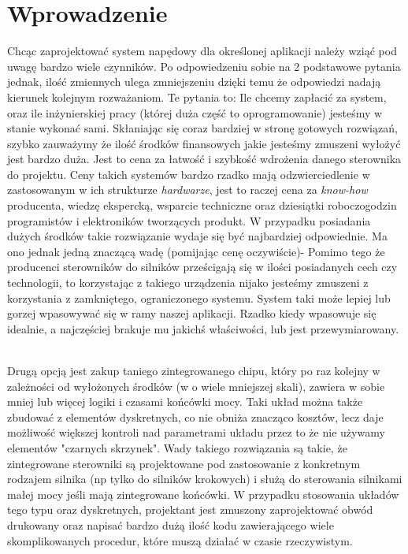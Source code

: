\section*{Wprowadzenie}
Chcąc zaprojektować system napędowy dla określonej aplikacji należy wziąć pod uwagę bardzo wiele czynników. Po odpowiedzeniu sobie na 2 podstawowe pytania jednak, ilość zmiennych ulega zmniejszeniu dzięki temu że odpowiedzi nadają kierunek kolejnym rozważaniom. Te pytania to: Ile chcemy zapłacić za system, oraz ile inżynierskiej pracy (której duża część to oprogramowanie) jesteśmy w stanie wykonać sami. Skłaniając się coraz bardziej w stronę gotowych rozwiązań, szybko zauważymy że ilość środków finansowych jakie jesteśmy zmuszeni wyłożyć jest bardzo duża. Jest to cena za łatwość i szybkość wdrożenia danego sterownika do projektu. Ceny takich systemów bardzo rzadko mają odzwierciedlenie w zastosowanym w ich strukturze {\it hardwarze}, jest to raczej cena za {\it know-how} producenta, wiedzę ekspercką, wsparcie techniczne oraz dziesiątki roboczogodzin programistów i elektroników tworzących produkt. W przypadku posiadania dużych środków takie rozwiązanie wydaje się być najbardziej odpowiednie. Ma ono jednak jedną znaczącą wadę (pomijając cenę oczywiście)- Pomimo tego że producenci sterowników do silników prześcigają się w ilości posiadanych cech czy technologii, to korzystając z takiego urządzenia nijako jesteśmy zmuszeni z korzystania z zamkniętego, ograniczonego systemu. System taki może lepiej lub gorzej wpasowywać się w ramy naszej aplikacji. Rzadko kiedy wpasowuje się idealnie, a najczęściej brakuje mu jakichś właściwości, lub jest przewymiarowany. \

Drugą opcją jest zakup taniego zintegrowanego chipu, który po raz kolejny w zależności od wyłożonych środków (w o wiele mniejszej skali), zawiera w sobie mniej lub więcej logiki i czasami końcówki mocy. Taki układ można także zbudować z elementów dyskretnych, co nie obniża znacząco kosztów, lecz daje możliwość większej kontroli nad parametrami układu przez to że nie używamy elementów "czarnych skrzynek". Wady takiego rozwiązania są takie, że zintegrowane sterowniki są projektowane pod zastosowanie z konkretnym rodzajem silnika (np tylko do silników krokowych) i służą do sterowania silnikami małej mocy jeśli mają zintegrowane końcówki. W przypadku stosowania układów tego typu oraz dyskretnych, projektant jest zmuszony zaprojektować obwód drukowany oraz napisać bardzo dużą ilość kodu zawierającego wiele skomplikowanych procedur, które muszą działać w czasie rzeczywistym. \

